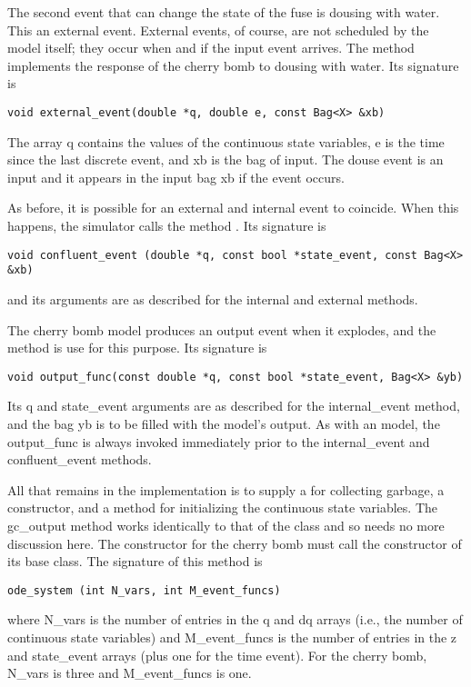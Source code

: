 The second event that can change the state of the fuse is dousing with water. This an external event. External events, of course, are not scheduled by the model itself; they occur when and if the input event arrives. The  method implements the response of the cherry bomb to dousing with water. Its signature is
\begin{verbatim}
void external_event(double *q, double e, const Bag<X> &xb)
\end{verbatim}
The array q contains the values of the continuous state variables, e is the time since the last discrete event, and xb is the bag of input. The douse event is an input and it appears in the input bag xb if the event occurs. 

As before, it is possible for an external and internal event to coincide. When this happens, the simulator calls the method . Its signature is
\begin{verbatim}
void confluent_event (double *q, const bool *state_event, const Bag<X> &xb)
\end{verbatim}
and its arguments are as described for the internal and external methods.

The cherry bomb model produces an output event when it explodes, and the  method is use for this purpose. Its signature is
\begin{verbatim}
void output_func(const double *q, const bool *state_event, Bag<X> &yb)
\end{verbatim}
Its q and state\_event arguments are as described for the internal\_event method, and the bag yb is to be filled with the model's output. As with an  model, the output\_func is always invoked immediately prior to the internal\_event and confluent\_event methods.

All that remains in the implementation is to supply a  for collecting garbage, a constructor, and a method for initializing the continuous state variables. The gc\_output method works identically to that of the  class and so needs no more discussion here. The constructor for the cherry bomb must call the constructor of its  base class. The signature of this method is
\begin{verbatim}
ode_system (int N_vars, int M_event_funcs)
\end{verbatim}
where N\_vars is the number of entries in the q and dq arrays (i.e., the number of continuous state variables) and M\_event\_funcs is the number of entries in the z and state\_event arrays (plus one for the time event). For the cherry bomb, N\_vars is three and M\_event\_funcs is one.

